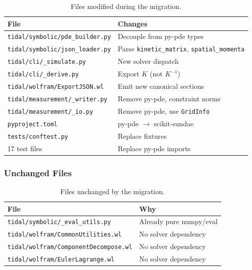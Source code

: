 \begin{table}[htbp]
\centering
\caption{Files modified during the migration.}
\label{tab:modified-files}
\begin{tabular}{@{}ll@{}}
\toprule
File & Changes \\
\midrule
\texttt{tidal/symbolic/pde\_builder.py} & Decouple from py-pde types \\
\texttt{tidal/symbolic/json\_loader.py} & Parse \texttt{kinetic\_matrix}, \texttt{spatial\_momenta} \\
\texttt{tidal/cli/\_simulate.py} & New solver dispatch \\
\texttt{tidal/cli/\_derive.py} & Export $K$ (not $K^{-1}$) \\
\texttt{tidal/wolfram/ExportJSON.wl} & Emit new canonical sections \\
\texttt{tidal/measurement/\_writer.py} & Remove py-pde, constraint norms \\
\texttt{tidal/measurement/\_io.py} & Remove py-pde, use \texttt{GridInfo} \\
\texttt{pyproject.toml} & py-pde $\to$ scikit-sundae \\
\texttt{tests/conftest.py} & Replace fixtures \\
17 test files & Replace py-pde imports \\
\bottomrule
\end{tabular}
\end{table}

\subsubsection{Unchanged Files}

\begin{table}[htbp]
\centering
\caption{Files unchanged by the migration.}
\label{tab:unchanged-files}
\begin{tabular}{@{}ll@{}}
\toprule
File & Why \\
\midrule
\texttt{tidal/symbolic/\_eval\_utils.py} & Already pure numpy/eval \\
\texttt{tidal/wolfram/CommonUtilities.wl} & No solver dependency \\
\texttt{tidal/wolfram/ComponentDecompose.wl} & No solver dependency \\
\texttt{tidal/wolfram/EulerLagrange.wl} & No solver dependency \\
\bottomrule
\end{tabular}
\end{table}
